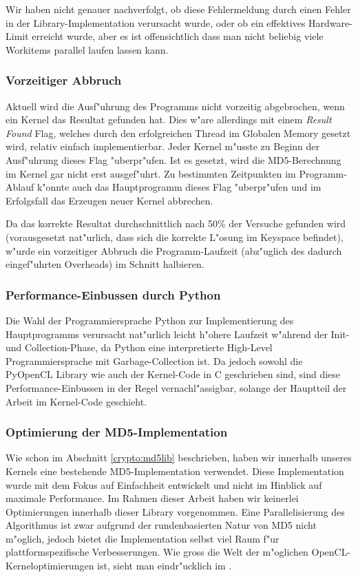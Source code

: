 \begin{refsection}
Wir haben nicht genauer nachverfolgt, ob diese Fehlermeldung durch einen Fehler
in der Library-Implementation verursacht wurde, oder ob ein effektives
Hardware-Limit erreicht wurde, aber es ist offensichtlich dass man nicht
beliebig viele Workitems parallel laufen lassen kann.

\subsubsection{Vorzeitiger Abbruch}

Aktuell wird die Ausf"uhrung des Programms nicht vorzeitig abgebrochen, wenn ein
Kernel das Resultat gefunden hat. Dies w"are allerdings mit einem \textit{Result
Found} Flag, welches durch den erfolgreichen Thread im Globalen Memory gesetzt
wird, relativ einfach implementierbar. Jeder Kernel m"usste zu Beginn der
Ausf"uhrung dieses Flag "uberpr"ufen. Ist es gesetzt, wird die MD5-Berechnung im
Kernel gar nicht erst ausgef"uhrt. Zu bestimmten Zeitpunkten im Programm-Ablauf
k"onnte auch das Hauptprogramm dieses Flag "uberpr"ufen und im Erfolgsfall das
Erzeugen neuer Kernel abbrechen.

Da das korrekte Resultat durchschnittlich nach 50\% der Versuche gefunden wird
(vorausgesetzt nat"urlich, dass sich die korrekte L"osung im Keyspace befindet),
w"urde ein vorzeitiger Abbruch die Programm-Laufzeit (abz"uglich des dadurch
eingef"uhrten Overheads) im Schnitt halbieren.

\subsubsection{Performance-Einbussen durch Python}

Die Wahl der Programmiersprache Python zur Implementierung des Hauptprogramms
verursacht nat"urlich leicht h"ohere Laufzeit w"ahrend der Init- und
Collection-Phase, da Python eine interpretierte High-Level Programmiersprache
mit Garbage-Collection ist. Da jedoch sowohl die PyOpenCL Library wie auch der
Kernel-Code in C geschrieben sind, sind diese Performance-Einbussen in der Regel
vernachl"assigbar, solange der Hauptteil der Arbeit im Kernel-Code geschieht.

\subsubsection{Optimierung der MD5-Implementation}

Wie schon im Abschnitt \ref{crypto:md5lib} beschrieben, haben wir innerhalb
unseres Kernels eine bestehende MD5-Implementation verwendet. Diese
Implementation wurde mit dem Fokus auf Einfachheit entwickelt und nicht im
Hinblick auf maximale Performance. Im Rahmen dieser Arbeit haben wir keinerlei
Optimierungen innerhalb dieser Library vorgenommen. Eine Parallelisierung des
Algorithmus ist zwar aufgrund der rundenbasierten Natur von MD5 nicht m"oglich,
jedoch bietet die Implementation selbst viel Raum f"ur plattformspezifische
Verbesserungen. Wie gross die Welt der m"oglichen OpenCL-Kerneloptimierungen
ist, sieht man eindr"ucklich im
 \cite{crypto:nvidia_bestpractices}.



\end{refsection}
